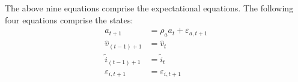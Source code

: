 \documentclass[12 pt, oneside]{article}
\theoremstyle{definition}
\theoremstyle{definition}
\theoremstyle{definition}
\newcommand{\fd}{\vspace{2.5mm}}
\begin{document}
\fd

The above nine equations comprise the expectational equations. The following four equations comprise the states:
\begin{align*}
  a_{t + 1} & = \rho_a a_t + \varepsilon_{a, t + 1}\\
  \hat{v}_{(t - 1) + 1} & = \hat{v}_t\\
  \tilde{i}_{(t - 1) + 1} & = \tilde{i}_t\\
  \varepsilon_{i, t + 1} & = \varepsilon_{i, t + 1}
\end{align*}
\end{document}

